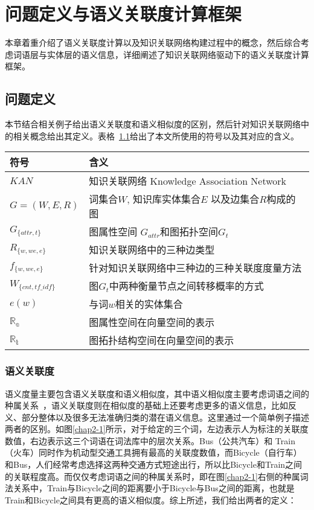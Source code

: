 \chapter{问题定义与语义关联度计算框架}
\label{chap:chap02}
本章着重介绍了语义关联度计算以及知识关联网络构建过程中的概念，然后综合考虑词语层与实体层的语义信息，详细阐述了知识关联网络驱动下的语义关联度计算框架。

\section{问题定义}
本节结合相关例子给出语义关联度和语义相似度的区别，然后针对知识关联网络中的相关概念给出其定义。表格~\ref{symbols}给出了本文所使用的符号以及其对应的含义。
\begin{table}[!ht]
    \center
    \vspace{5pt}
    \begin{tabular}{|p{2.5cm}|p{9cm}|}
    \hline
    \bf{符号} & \bf{含义} \\ \hline
    $KAN$ & 知识关联网络 Knowledge Association Network \\ \hline
    $G = (W, E, R)$ & 词集合$W$, 知识库实体集合$E$ 以及边集合$R$构成的图\\ \hline
    $G_{\{attr, t\}}$ & 图属性空间 $G_{attr}$和图拓扑空间$G_t$ \\ \hline
    $R_{\{w,we,e\}}$ & 知识关联网络中的三种边类型 \\ \hline
    $f_{\{w,we,e\}}$ & 针对知识关联网络中三种边的三种关联度度量方法 \\ \hline
    $W_{\{cnt,tf\_idf\}}$ &图$G_t$中两种衡量节点之间转移概率的方式\\ \hline
    $e(w)$ & 与词$w$相关的实体集合 \\ \hline
    $\mathbb{R_a}$ & 图属性空间在向量空间的表示 \\ \hline
    $\mathbb{R_t}$ & 图拓扑结构空间在向量空间的表示 \\ \hline
    \end{tabular}
    \label{symbols}
\end{table}


\subsection{语义关联度}

语义度量主要包含语义关联度和语义相似度，其中语义相似度主要考虑词语之间的种属关系~\cite{geoinformatica/BallatoreBW14}，语义关联度则在相似度的基础上还要考虑更多的语义信息，比如反义、部分整体以及很多无法准确归类的潜在语义信息。这里通过一个简单例子描述两者的区别。如图\ref{chap2-1}所示，对于给定的三个词，左边表示人为标注的关联度数值，右边表示这三个词语在词法库中的层次关系。Bus（公共汽车）和 Train（火车）同时作为机动型交通工具拥有最高的关联度数值，而Bicycle（自行车）和Bus，人们经常考虑选择这两种交通方式短途出行，所以比Bicycle和Train之间的关联程度高。而仅仅考虑词语之间的种属关系时，即在图\ref{chap2-1}右侧的种属词法关系中，Train与Bicycle之间的距离要小于Bicycle与Bus之间的距离，也就是Train和Bicycle之间具有更高的语义相似度。综上所述，我们给出两者的定义：


